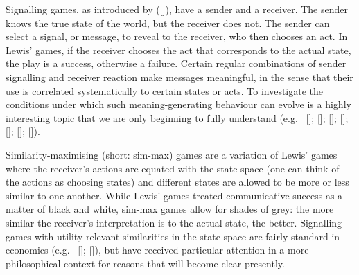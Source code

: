 \documentclass[12pt,english]{article}
\numberwithin{equation}{section}
\newcommand{\citetbjps}[1]{\citeauthor{#1} ([\citeyear{#1}])}
\newcommand{\citealtbjps}[1]{\citeauthor{#1} [\citeyear{#1}]}
\begin{document}
Signalling games, as introduced by \citetbjps{Lewis_1969:Convention}, have
a sender and a receiver. The sender knows the true state of the world,
but the receiver does not. The sender can select a signal, or message,
to reveal to the receiver, who then chooses an act. In Lewis' games,
if the receiver chooses the act that corresponds to the actual state,
the play is a success, otherwise a failure. Certain regular
combinations of sender signalling and receiver reaction make messages
meaningful, in the sense that their use is correlated systematically
to certain states or acts. To investigate the conditions under which
such meaning-generating behaviour can evolve is a highly interesting
topic that we are only beginning to fully understand
(e.g.~\citealtbjps{Warneryd1993:Cheap-Talk-Coor}; \citealtbjps{BlumeKim1993:Evolutionary-St}; \citealtbjps{Huttegger2007:Evolution-and-t}; \citealtbjps{Pawlowitsch2008:Why-Evolution-d}; \citealtbjps{Barrett2009:The-Evolution-o}; \citealtbjps{HutteggerSkyrms2010:Evolutionary-Dy}; \citealtbjps{Skyrms2010:Signals}).

Similarity-maximising (short: sim-max) games are a variation of Lewis' games where the
receiver's actions are equated with the state space (one can think of the actions as choosing
states) and different states are allowed to be more or less similar to one another. While
Lewis' games treated communicative success as a matter of black and white, sim-max games allow
for shades of grey: the more similar the receiver's interpretation is to the actual state, the
better. Signalling games with utility-relevant similarities in the state space are fairly
standard in economics
(e.g.~\citealtbjps{Spence1973:Job-market-sign}; \citealtbjps{CrawfordSobel1982:Strategic-Infor}), but have received
particular attention in a more philosophical context for reasons that will become clear
presently.
\end{document}
